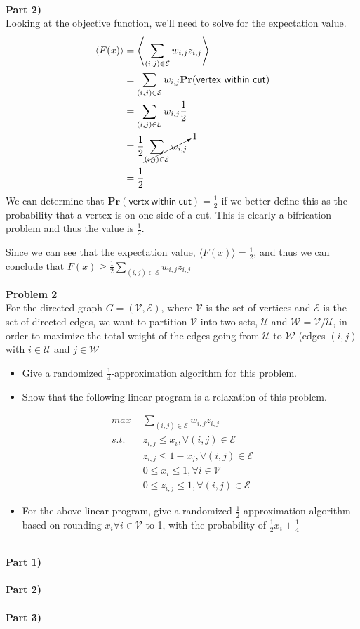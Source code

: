 \documentclass[12pt,letter]{article}
\newcommand{\problem}[1]{\vspace{3mm}\Large\textbf{{Problem {#1}\vspace{3mm}}}\normalsize\\}
\newcommand{\ppart}[1]{\vspace{2mm}\large\textbf{\\Part {#1})\vspace{2mm}}\normalsize\\}
\begin{document}
\ppart{2}
Looking at the objective function, we'll need to solve for the expectation value.
\begin{align*}
    \langle F(x)\rangle &= \left\langle\sum\limits_{(i,j)\in\mathcal{E}} w_{i,j}z_{i,j}\right\rangle\\
           &= \sum\limits_{(i,j)\in\mathcal{E}} w_{i,j}\mathbf{Pr}(\mathsf{vertex\ within\ cut}) \\
           &= \sum\limits_{(i,j)\in\mathcal{E}} w_{i,j}\frac12\\
           &= \frac12 \cancelto{1}{\sum\limits_{(i,j)\in\mathcal{E}}w_{i,j}} \\
           &= \frac12
\end{align*}
We can determine that $\mathbf{Pr}(\mathsf{vertx\ within\ cut}) = \frac12$ if
we better define this as the probability that a vertex is on one side of a cut.
This is clearly a bifrication problem and thus the value is $\frac12$.

Since we can see that the expectation value, $\langle F(x)\rangle = \frac12$, 
and thus we can conclude that $F(x)\geq \frac12\sum\limits_{(i,j)\in\mathcal{E}}w_{i,j}z_{i,j}$

\problem{2}
For the directed graph $G=(\mathcal{V,E})$, where $\mathcal{V}$ is the set of 
vertices and $\mathcal{E}$ is the set of directed edges, we want to partition 
$\mathcal{V}$ into two sets, $\mathcal{U}$ and $\mathcal{W}=\mathcal{V}/
\mathcal{U}$, in order to maximize the total weight of the edges going from 
$\mathcal{U}$ to $\mathcal{W}$ (edges $(i,j)$ with $i\in\mathcal{U}$ and 
$j\in\mathcal{W}$

\begin{itemize}
    \item Give a randomized $\frac14$-approximation algorithm for this problem.
    \item Show that the following linear program is a relaxation of this problem.
\end{itemize}
\begin{align*}
    max & \sum\limits_{(i,j)\in\mathcal{E}} w_{i,j}z_{i,j}\\
    s.t.\hspace{1em}& z_{i,j} \leq x_i, \forall(i,j)\in \mathcal{E}\\
        & z_{i,j}\leq 1 - x_j, \forall(i,j)\in \mathcal{E}\\
        & 0 \leq x_i \leq 1, \forall i\in \mathcal{V}\\
        & 0 \leq z_{i,j} \leq 1, \forall (i,j)\in\mathcal{E}
\end{align*}
\begin{itemize}
    \item For the above linear program, give a randomized $\frac12$-approximation
          algorithm based on rounding $x_i\forall i\in\mathcal{V}$ to 1, with the
          probability of $\frac12x_i + \frac14$
\end{itemize}

\ppart{1}

\ppart{2}

\ppart{3}
\end{document}
